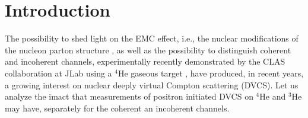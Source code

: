 \documentclass[times, twoside]{PosWhiPap}
\begin{document}
\section*{Introduction}
{
The possibility to shed 
   light on the EMC effect, i.e., the nuclear modifications of the nucleon 
   parton structure \cite{Dupre:2015jha, Cloet:2019mql}, as well as
   the possibility to distinguish coherent and incoherent 
   channels, experimentally recently demonstrated by 
   the CLAS collaboration at JLab using a $^4$He gaseous target
     \cite{Hattawy:2017woc, Hattawy:2018liu},
   have produced, in recent years, a growing interest on nuclear deeply virtual Compton scattering (DVCS). Let us analyze
   the imact that measurements of positron initiated DVCS on $^4$He and $^3$He may have, separately for the coherent an incoherent channels}.
\end{document}
